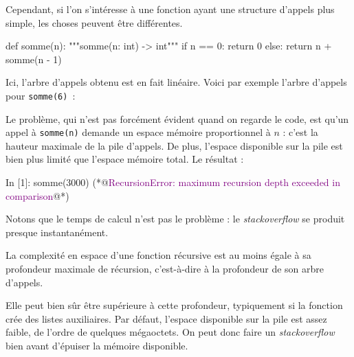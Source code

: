 \documentclass{magnolia}
\begin{document}
Cependant, si l'on s'intéresse à une fonction ayant une structure
d'appels plus simple, les choses peuvent être différentes.
\begin{pythoncodeline}
def somme(n):
    """somme(n: int) -> int"""
    if n == 0:
        return 0
    else:
        return n + somme(n - 1)
\end{pythoncodeline}
Ici, l'arbre d'appels obtenu est en fait linéaire. Voici par exemple l'arbre d'appels
pour \verb!somme(6)!~:
\begin{center}
\end{center}
Le problème, qui n'est pas forcément évident quand on regarde le code,
est qu'un appel à \verb!somme(n)! demande un espace mémoire proportionnel
à $n$ : c'est la hauteur maximale de la pile d'appels.
De plus, l'espace disponible sur la pile est bien plus limité que
l'espace mémoire total. Le résultat :
\begin{pythoncode}
In [1]: somme(3000)
(*@\textcolor{purple}{RecursionError: maximum recursion depth exceeded in comparison}@*)
\end{pythoncode}
Notons que le temps de calcul n'est pas le problème : le \emph{stackoverflow}
 se produit presque instantanément.
\begin{proposition}
  La complexité en espace d'une fonction récursive est au moins égale à sa
  profondeur maximale de récursion, c'est-à-dire à la profondeur de son arbre
  d'appels.
\end{proposition}
\begin{remarques}
  \remarque Elle peut bien sûr être supérieure à cette profondeur, typiquement si la
  fonction crée des listes auxiliaires.
  \remarque Par défaut, l'espace disponible sur la pile est assez faible, de l'ordre de quelques mégaoctets. On peut donc faire un
  \emph{stackoverflow} bien avant d'épuiser la mémoire disponible.
\end{remarques}
\end{document}
